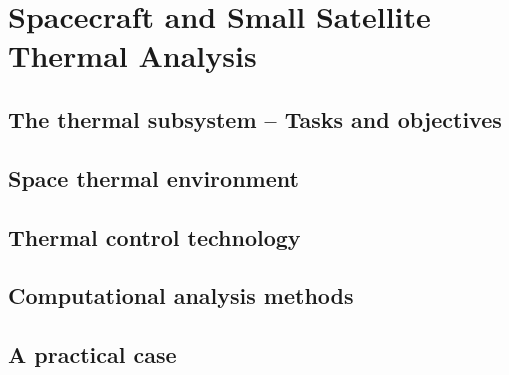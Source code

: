 %
%
%


\chapter{Spacecraft and Small Satellite Thermal Analysis}
\label{chp:Thermal}

    
\section{The thermal subsystem – Tasks and objectives}
\label{sec:Thermal_Subsystem}

\lipsum




\section{Space thermal environment}
\label{sec:Thermal_Environment}

\lipsum



\section{Thermal control technology}
\label{sec:Thermal_Technology}

\lipsum




\section{Computational analysis methods}
\label{sec:Thermal_Methods}

\lipsum



\section{A practical case}
\label{sec:Thermal_Pratical}

